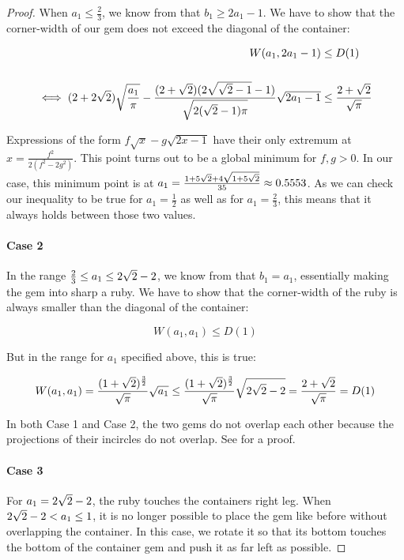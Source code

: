 \documentclass[a4paper,style=print,bibliography=totoc,nexus,lnum,extramargin]{tubsbook}
\begin{document}
\begin{proof}
    When $a_1 \le \frac{2}{3}$, we know from  that $b_1 \ge 2a_1 - 1$. We have to show that the corner-width of our gem does not exceed the diagonal of the container:

    \begin{align*}
        W(a_1, 2a_1-1) &\le D(1)\\
        \\
        \iff (2+2\sqrt{2})\sqrt{\frac{a_1}{\pi}} - \frac{(2+\sqrt{2})(2\sqrt{\sqrt{2}-1}-1)}{\sqrt{2(\sqrt{2}-1)\pi}}\sqrt{2a_1-1} &\le \frac{2+\sqrt{2}}{\sqrt{\pi}}
    \end{align*}

    Expressions of the form $f\sqrt{x} - g\sqrt{2x-1}$ have their only extremum at $x = \frac{f^2}{2(f^2-2g^2)}$. This point turns out to be a global minimum for $f,g > 0$.
    In our case, this minimum point is at $a_1 = \frac{1+5\sqrt{2}+4\sqrt{1+5\sqrt{2}}}{35} \approx 0.5553$.
    As we can check our inequality to be true for $a_1 = \frac{1}{2}$ as well as for $a_1 = \frac 2 3$, this means that it always holds between those two values.

    \paragraph{Case 2}

    In the range $\frac{2}{3} \le a_1 \le 2\sqrt{2}-2$, we know from  that $b_1 = a_1$, essentially making the gem into sharp a ruby. We have to show that the corner-width of the ruby is always smaller than the diagonal of the container:

    $$W(a_1, a_1) \le D(1)$$

    But in the range for $a_1$ specified above, this is true:

    $$W(a_1, a_1) = \frac{(1+\sqrt{2})^{\frac{3}{2}}}{\sqrt{\pi}}\sqrt{a_1} \le \frac{(1+\sqrt{2})^{\frac{3}{2}}}{\sqrt{\pi}}\sqrt{2\sqrt{2}-2} = \frac{2+\sqrt{2}}{\sqrt{\pi}} = D(1)$$

    In both Case 1 and Case 2, the two gems do not overlap each other because the projections of their incircles do not overlap. See  for a proof.

    \paragraph{Case 3}

    For $a_1 = 2\sqrt{2}-2$, the ruby touches the containers right leg.
    When $2\sqrt{2}-2 < a_1 \le 1$, it is no longer possible to place the gem like before without overlapping the container. In this case, we rotate it so that its bottom touches the bottom of the container gem and push it as far left as possible.


\end{proof}
\end{document}
